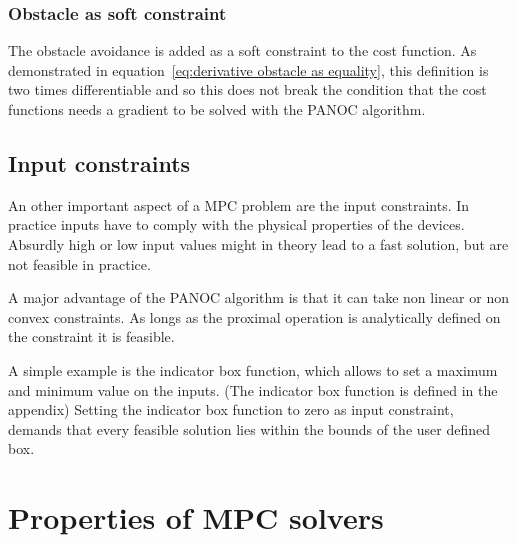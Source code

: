 			\subsubsection{Obstacle as soft constraint}
				The obstacle avoidance is added as a soft constraint to the cost function. As demonstrated in equation~\ref{eq:derivative obstacle as equality}, this definition is two times differentiable and so this does not break the condition that the cost functions needs a gradient to be solved with the PANOC algorithm.
			
		\subsection{Input constraints}
			An other important aspect of a MPC problem are the input constraints. In practice inputs have to comply with the physical properties of the devices. Absurdly high or low input values might in theory lead to a fast solution, but are not feasible in practice.
			
			A major advantage of the PANOC algorithm is that it can take non linear or non convex constraints. As longs as the proximal operation is analytically defined on the constraint it is feasible. 
			
			A simple example is the indicator box function, which allows to set a maximum and minimum value on the inputs. (The indicator box function is defined in the appendix) Setting the indicator box function to zero as input constraint, demands that every feasible solution lies within the bounds of the user defined box.
			
\section{Properties of MPC solvers}
